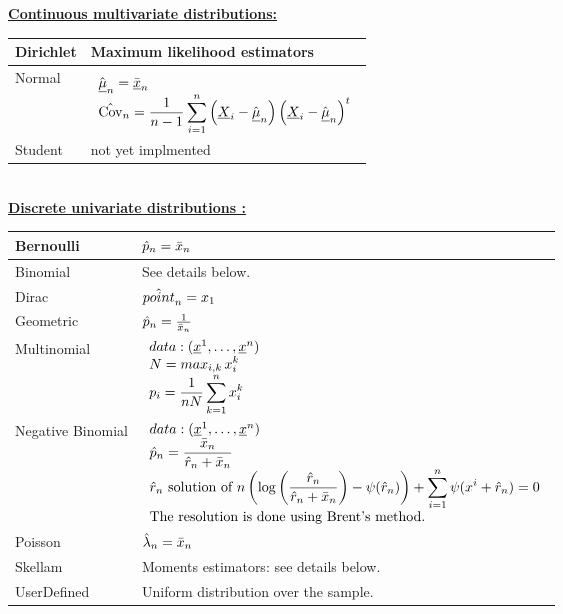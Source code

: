 {  %




  \underline{\textbf{Continuous multivariate distributions:}}\\

  \begin{tabular}{|l|p{12cm}|}
    \hline
    Dirichlet  &   Maximum likelihood estimators\\
    \hline
    Normal & $\begin{array}{l}
      \displaystyle\Hat{{\underline{\mu}}}_n^{\strut} = \bar{{\underline{x}}}_n\\
      \displaystyle\Hat{\mathrm{Cov}}_n = \frac{1}{n-1}\sum_{i=1}^n\left({\underline{X}}_i-\Hat{{\underline{\mu}}}_n\right)\left({\underline{X}}_i-\Hat{{\underline{\mu}}}_n\right)^t
    \end{array}$\\
    \hline
    Student  & not yet implmented \\
    \hline
  \end{tabular}\rule{0pt}{1em}\\



  \underline{\textbf{Discrete univariate distributions :}}\\

  \begin{tabular}{|l|p{12cm}|}
    \hline
    Bernoulli & $\Hat{p}_n = \bar{x}_n$\\
    \hline
    Binomial & See details below.\\
    \hline
    Dirac & $\Hat{point}_n = x_1$\\
    \hline
    Geometric & $\Hat{p}_n = \frac{1}{\bar{x}_n}$\\
    \hline
    Multinomial &
    $
    \begin{array}{l}
      data : ({\underline{x}}^1, \hdots,{\underline{x}}^n)\\
      \displaystyle  N = max_{i,k} \, x_i^k \\
      \displaystyle  p_i = \frac{1}{nN} \sum_{k=1}^{n} x_i^k
    \end{array}
    $\\
    \hline
    Negative Binomial &
    $
    \begin{array}{l}
      data : ({\underline{x}}^1, \hdots,{\underline{x}}^n)\\
      \displaystyle  \hat{p}_n = \frac{\bar{x}_n}{\hat{r}_n+\bar{x}_n} \\
      \displaystyle  \hat{r}_n\mbox{ solution of } n\left(\log\left(\frac{\hat{r}_n}{\hat{r}_n+\bar{x}_n}\right)-\psi(\hat{r}_n)\right)+\sum_{i=1}^n\psi(x^i+\hat{r}_n)=0\\
      \mbox{The resolution is done using Brent's method.}
    \end{array}
    $\\
    \hline
    Poisson & $\displaystyle\Hat{\lambda}_n = \bar{x}_n$\\
    \hline
    Skellam   & Moments estimators: see details below.\\
    \hline
    UserDefined & Uniform distribution over the sample.\\
    \hline
  \end{tabular}\rule{0pt}{1em}\\


}
